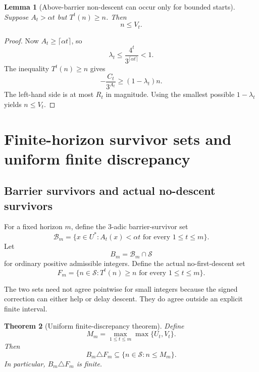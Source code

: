 \documentclass[11pt]{article}
\newtheorem{theorem}{Theorem}[section]
\newtheorem{lemma}[theorem]{Lemma}
\theoremstyle{definition}
\theoremstyle{remark}
\newcommand{\Sset}{\mathcal S}
\begin{document}
\begin{lemma}[Above-barrier non-descent can occur only for bounded starts]
Suppose $A_t>\alpha t$ but $T^t(n)\ge n$.  Then
\[
n\le V_t.
\]
\end{lemma}

\begin{proof}
Now $A_t\ge\lceil\alpha t\rceil$, so
\[
\lambda_t\le\frac{4^t}{3^{\lceil\alpha t\rceil}}<1.
\]
The inequality $T^t(n)\ge n$ gives
\[
-\frac{C_t}{3^{A_t}}
\ge(1-\lambda_t)n.
\]
The left-hand side is at most $R_t$ in magnitude.  Using the smallest possible $1-\lambda_t$ yields $n\le V_t$.
\end{proof}

\section{Finite-horizon survivor sets and uniform finite discrepancy}

\subsection{Barrier survivors and actual no-descent survivors}

For a fixed horizon $m$, define the $3$-adic barrier-survivor set
\begin{equation}
\mathcal B_m
=
\{x\in U^\ast:A_t(x)<\alpha t\text{ for every }1\le t\le m\}.
\label{eq:Bm}
\end{equation}
Let
\[
B_m=\mathcal B_m\cap\Sset
\]
for ordinary positive admissible integers.  Define the actual no-first-descent set
\begin{equation}
F_m
=
\{n\in\Sset:T^t(n)\ge n\text{ for every }1\le t\le m\}.
\label{eq:Fm}
\end{equation}

The two sets need not agree pointwise for small integers because the signed correction can either help or delay descent.  They do agree outside an explicit finite interval.

\begin{theorem}[Uniform finite-discrepancy theorem]
Define
\begin{equation}
M_m
=
\max_{1\le t\le m}\max\{U_t,V_t\}.
\label{eq:Mm}
\end{equation}
Then
\begin{equation}
B_m\triangle F_m
\subseteq
\{n\in\Sset:n\le M_m\}.
\label{eq:finite-discrepancy}
\end{equation}
In particular, $B_m\triangle F_m$ is finite.
\end{theorem}
\end{document}
